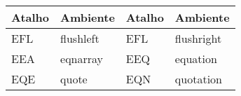 % 
% 
% 
% 
% 
\begin{tabular}{llll}
    \hline
    Atalho & Ambiente & Atalho & Ambiente \\ \hline
    \textsf{EFL} & \textsf{flushleft} & \textsf{EFL} & \textsf{flushright} \\
    \textsf{EEA} & \textsf{eqnarray} & \textsf{EEQ} & \textsf{equation} \\
    \textsf{EQE} & \textsf{quote} & \textsf{EQN} & \textsf{quotation} \\ \hline
\end{tabular}
